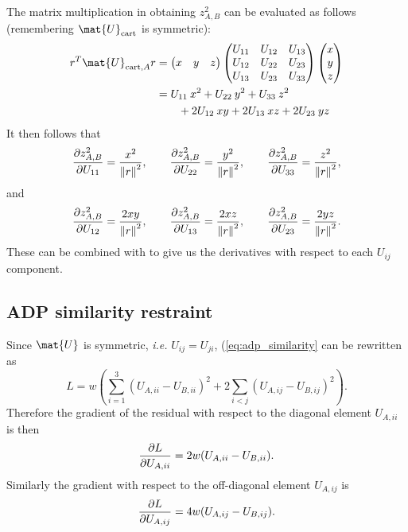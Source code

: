 \documentclass[pdf]{iucr}
\begin{document}
The matrix multiplication in obtaining $z^2_{A,B}$ can be evaluated as follows
(remembering $\mat{U}_{\text{cart}}$ is symmetric):
\begin{align}
r^T\mat{U}_{\text{cart},A}r &= 
\begin{pmatrix} x & y & z \end{pmatrix}
\begin{pmatrix} U_{11} & U_{12} & U_{13}\\
  U_{12} & U_{22} & U_{23}\\
  U_{13} & U_{23} & U_{33}\end{pmatrix}
\begin{pmatrix} x\\y\\z\end{pmatrix}\\
&= U_{11}\: x^2 + U_{22}\: y^2 + U_{33}\: z^2 \nonumber \\
&\qquad  + 2U_{12}\: xy + 2U_{13}\: xz + 2U_{23}\: yz
\end{align}
It then follows that
\begin{equation}
\frac{\partial z^2_{A,B}}{\partial U_{11}} = \frac{x^2}{\left\| r \right\|^2} ,\qquad
\frac{\partial z^2_{A,B}}{\partial U_{22}} = \frac{y^2}{\left\| r \right\|^2} ,\qquad
\frac{\partial z^2_{A,B}}{\partial U_{33}} = \frac{z^2}{\left\| r \right\|^2} ,
\end{equation}
and
\begin{equation}
\frac{\partial z^2_{A,B}}{\partial U_{12}} = \frac{2xy}{\left\| r \right\|^2} ,\qquad
\frac{\partial z^2_{A,B}}{\partial U_{13}} = \frac{2xz}{\left\| r \right\|^2} ,\qquad
\frac{\partial z^2_{A,B}}{\partial U_{23}} = \frac{2yz}{\left\| r \right\|^2} .
\end{equation}
These can be combined with  to give us the derivatives
with respect to each $U_{ij}$ component.


\subsection{ADP similarity restraint}

Since $\mat{U}$ is symmetric, \emph{i.e.} $U_{ij} = U_{ji}$, (\ref{eq:adp_similarity} can be rewritten as
\begin{equation}
L = w \left( \sum_{i=1}^3 (U_{A,ii} - U_{B,ii})^2 + 2 \sum_{i < j} (U_{A,ij} - U_{B,ij})^2 \right) .
\end{equation}
Therefore the gradient of the residual with respect to the diagonal element $U_{A,ii}$ is then
\begin{equation}
\frac{\partial L}{\partial U_{A,ii}} = 2w(U_{A,ii} - U_{B,ii}).
\end{equation}
Similarly the gradient with respect to the off-diagonal element $U_{A,ij}$ is
\begin{equation}
\frac{\partial L}{\partial U_{A,ij}} = 4w(U_{A,ij} - U_{B,ij}).
\end{equation}
\end{document}
